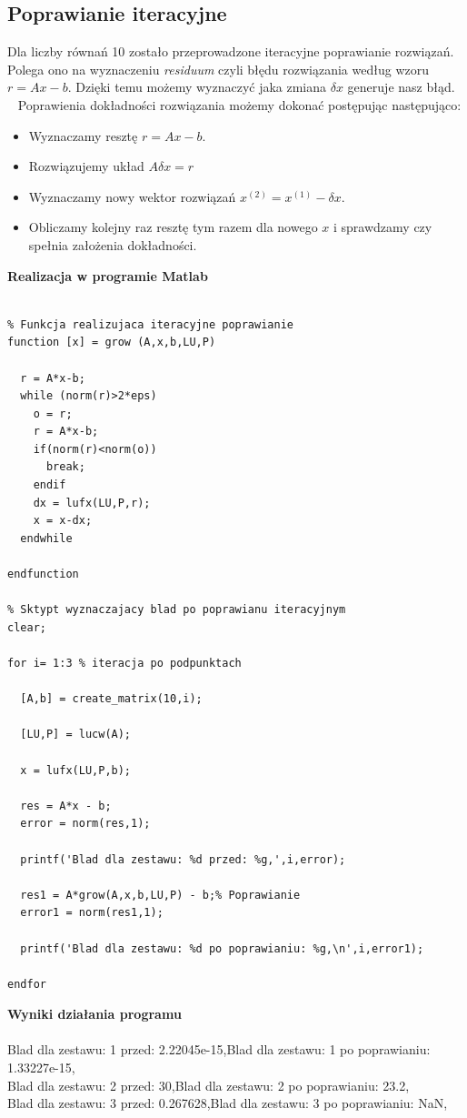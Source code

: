 \documentclass[a4paper, 11pt]{article}
\begin{document}
\subsection{Poprawianie iteracyjne}
Dla liczby równań 10 zostało przeprowadzone iteracyjne poprawianie rozwiązań. Polega ono na wyznaczeniu \textsl{residuum} czyli błędu rozwiązania według wzoru $r = Ax -b$. Dzięki temu możemy wyznaczyć jaka zmiana $\delta x$ generuje nasz błąd. ~\cite{tatjewski}
Poprawienia dokładności rozwiązania możemy dokonać postępując następująco: 
\begin{itemize}
\item Wyznaczamy resztę $r = Ax -b$.
\item Rozwiązujemy układ $A\delta x = r$
\item Wyznaczamy nowy wektor rozwiązań $x^{(2)} = x^{(1)} -\delta x$.
\item Obliczamy kolejny raz resztę tym razem dla nowego $x$ i sprawdzamy czy spełnia założenia dokładności.
\end{itemize}

\textbf{Realizacja w programie Matlab}\\
\\
\begin{lstlisting}
% Funkcja realizujaca iteracyjne poprawianie
function [x] = grow (A,x,b,LU,P)

  r = A*x-b;
  while (norm(r)>2*eps)
    o = r; 
    r = A*x-b;
    if(norm(r)<norm(o))
      break; 
    endif
    dx = lufx(LU,P,r);
    x = x-dx;
  endwhile

endfunction

% Sktypt wyznaczajacy blad po poprawianu iteracyjnym
clear;

for i= 1:3 % iteracja po podpunktach
  
  [A,b] = create_matrix(10,i);

  [LU,P] = lucw(A);
  
  x = lufx(LU,P,b);
  
  res = A*x - b;
  error = norm(res,1); 
  
  printf('Blad dla zestawu: %d przed: %g,',i,error); 
   
  res1 = A*grow(A,x,b,LU,P) - b;% Poprawianie
  error1 = norm(res1,1);
  
  printf('Blad dla zestawu: %d po poprawianiu: %g,\n',i,error1);
  
endfor

\end{lstlisting}

\vspace{1cm}
\textbf{Wyniki działania programu}\\
\\
Blad dla zestawu: 1 przed: 2.22045e-15,Blad dla zestawu: 1 po poprawianiu: 1.33227e-15,\\
Blad dla zestawu: 2 przed: 30,Blad dla zestawu: 2 po poprawianiu: 23.2,\\
Blad dla zestawu: 3 przed: 0.267628,Blad dla zestawu: 3 po poprawianiu: NaN,\\
\end{document}
